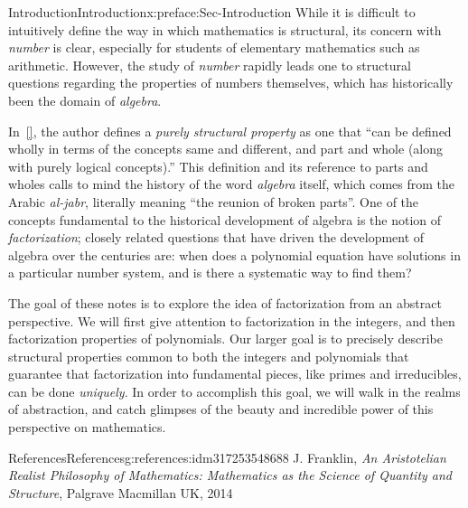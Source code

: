 \documentclass[oneside,10pt,]{book}
\newcommand{\xreffont}{\relax}
\numberwithin{equation}{section}
\begin{document}
\begin{preface}{Introduction}{}{Introduction}{}{}{x:preface:Sec-Introduction}
While it is difficult to intuitively define the way in which mathematics is structural, its concern with \emph{number} is clear, especially for students of elementary mathematics such as arithmetic. However, the study of \emph{number} rapidly leads one to structural questions regarding the properties of numbers themselves, which has historically been the domain of \emph{algebra}.%
\par
In~\hyperlink{x:biblio:franklin2014aristotelian}{[{\xreffont 1}]}, the author defines a \emph{purely structural property} as one that ``can be defined wholly in terms of the concepts same and different, and part and whole (along with purely logical concepts).'' This definition and its reference to parts and wholes calls to mind the history of the word \emph{algebra} itself, which comes from the Arabic \emph{al-jabr}, literally meaning ``the reunion of broken parts''. One of the concepts fundamental to the historical development of algebra is the notion of \emph{factorization}; closely related questions that have driven the development of algebra over the centuries are: when does a polynomial equation have solutions in a particular number system, and is there a systematic way to find them?%
\par
The goal of these notes is to explore the idea of factorization from an abstract perspective. We will first give attention to factorization in the integers, and then factorization properties of polynomials. Our larger goal is to precisely describe structural properties common to both the integers and polynomials that guarantee that factorization into fundamental pieces, like primes and irreducibles, can be done \emph{uniquely}. In order to accomplish this goal, we will walk in the realms of abstraction, and catch glimpses of the beauty and incredible power of this perspective on mathematics.%
%
%
\typeout{************************************************}
\typeout{************************************************}
%
\begin{references--numberless}{References}{}{References}{}{}{g:references:idm317253548688}
J. Franklin, \emph{An Aristotelian Realist Philosophy of Mathematics: Mathematics as the Science of Quantity and Structure}, Palgrave Macmillan UK, 2014\end{references--numberless}
\end{preface}
%
%
\typeout{************************************************}
\end{document}
